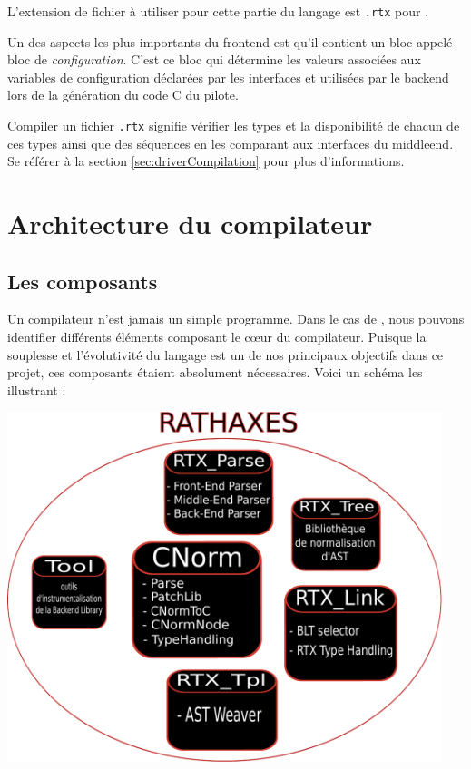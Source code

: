 \documentclass[french]{rtxreport}
\begin{document}
L'extension de fichier à utiliser pour cette partie du langage est
\texttt{.rtx} pour \rtx.

Un des aspects les plus importants du frontend est qu'il contient un bloc
appelé bloc de \emph{configuration}. C'est ce bloc qui détermine les valeurs
associées aux variables de configuration déclarées par les interfaces et
utilisées par le backend lors de la génération du code C du pilote.

Compiler un fichier \texttt{.rtx} signifie vérifier les types et la
disponibilité de chacun de ces types ainsi que des séquences en les comparant
aux interfaces du middleend. Se référer à la section
\ref{sec:driverCompilation} pour plus d'informations.



\chapter{Architecture du compilateur}

\section{Les composants}

Un compilateur n'est jamais un simple programme. Dans le cas de \rtx, nous
pouvons identifier différents éléments composant le cœur du compilateur.
Puisque la souplesse et l'évolutivité du langage est un de nos principaux
objectifs dans ce projet, ces composants étaient absolument nécessaires. Voici
un schéma les illustrant :

\includegraphics[width=0.95\textwidth]{diagramme_architecture.pdf}
\end{document}
